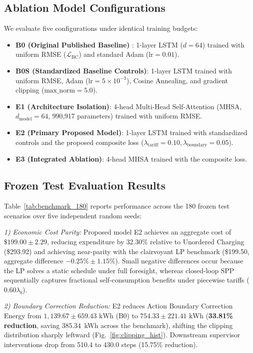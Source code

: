 \documentclass[journal]{IEEEtran}
\theoremstyle{remark}
\begin{document}
\subsection{Ablation Model Configurations}
We evaluate five configurations under identical training budgets:
\begin{itemize}
    \item \textbf{B0 (Original Published Baseline)} \cite{huang2024}: 1-layer LSTM ($d=64$) trained with uniform RMSE ($\mathcal{L}_{\mathrm{BC}}$) and standard Adam ($\mathrm{lr}=0.01$).
    \item \textbf{B0S (Standardized Baseline Controls)}: 1-layer LSTM trained with uniform RMSE, Adam ($\mathrm{lr}=5 \times 10^{-3}$), Cosine Annealing, and gradient clipping ($\text{max\_norm}=5.0$).
    \item \textbf{E1 (Architecture Isolation)}: 4-head Multi-Head Self-Attention (MHSA, $d_{\mathrm{model}}=64$, 990,917 parameters) trained with uniform RMSE.
    \item \textbf{E2 (Primary Proposed Model)}: 1-layer LSTM trained with standardized controls and the proposed composite loss ($\lambda_{\mathrm{tariff}}=0.10, \lambda_{\mathrm{boundary}}=0.05$).
    \item \textbf{E3 (Integrated Ablation)}: 4-head MHSA trained with the composite loss.
\end{itemize}

\subsection{Frozen Test Evaluation Results}
Table~\ref{tab:benchmark_180} reports performance across the 180 frozen test scenarios over five independent random seeds:

\textit{1) Economic Cost Parity:} Proposed model E2 achieves an aggregate cost of $\$199.00 \pm 2.29$, reducing expenditure by 32.30\% relative to Unordered Charging (\$293.92) and achieving near-parity with the clairvoyant LP benchmark (\$199.50, aggregate difference $-0.25\% \pm 1.15\%$). Small negative differences occur because the LP solves a static schedule under full foresight, whereas closed-loop SPP sequentially captures fractional self-consumption benefits under piecewise tariffs ($0.60\lambda_b$).

\textit{2) Boundary Correction Reduction:} E2 reduces Action Boundary Correction Energy from $1,139.67 \pm 659.43\text{ kWh}$ (B0) to $754.33 \pm 221.41\text{ kWh}$ (\textbf{33.81\% reduction}, saving 385.34~kWh across the benchmark), shifting the clipping distribution sharply leftward (Fig.~\ref{fig:clipping_hist}). Downstream supervisor interventions drop from 510.4 to 430.0 steps (15.75\% reduction).
\end{document}
